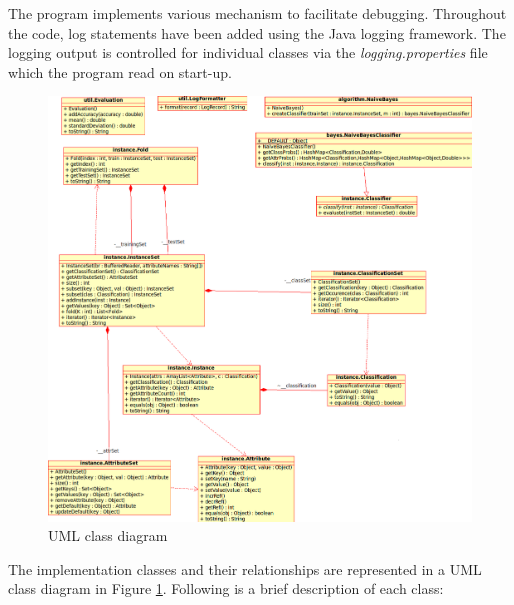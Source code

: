 \documentclass[10pt]{report}
\begin{document}
The program implements various mechanism to facilitate
debugging. Throughout the code, log statements have been added using
the Java logging framework. The logging output is controlled for
individual classes via the \textit{logging.properties} file which the program
read on start-up.

\begin{figure}
  \begin{center}
	\includegraphics[width=\textwidth,height=!]{uml}
  \end{center}
  \caption{UML class diagram}
  \label{fig:uml}
\end{figure} 

The implementation classes and their relationships are represented in a UML
class diagram in Figure \ref{fig:uml}. Following is a brief
description of each class:
\end{document}
